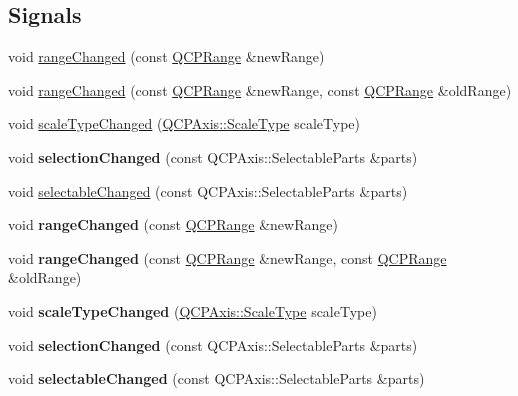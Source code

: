 \subsection*{Signals}
\begin{DoxyCompactItemize}
\item 
void \hyperlink{class_q_c_p_axis_a0894084e4c16a1736534c4095746f910}{range\+Changed} (const \hyperlink{class_q_c_p_range}{Q\+C\+P\+Range} \&new\+Range)
\item 
void \hyperlink{class_q_c_p_axis_aac8576288e8e31f16186124bc10dd10d}{range\+Changed} (const \hyperlink{class_q_c_p_range}{Q\+C\+P\+Range} \&new\+Range, const \hyperlink{class_q_c_p_range}{Q\+C\+P\+Range} \&old\+Range)
\item 
void \hyperlink{class_q_c_p_axis_a3505ed8a93bd2e349d858d84996bf767}{scale\+Type\+Changed} (\hyperlink{class_q_c_p_axis_a36d8e8658dbaa179bf2aeb973db2d6f0}{Q\+C\+P\+Axis\+::\+Scale\+Type} scale\+Type)
\item 
void {\bfseries selection\+Changed} (const Q\+C\+P\+Axis\+::\+Selectable\+Parts \&parts)\hypertarget{class_q_c_p_axis_a62b598abeee7174a05f9d542cc85b1f5}{}\label{class_q_c_p_axis_a62b598abeee7174a05f9d542cc85b1f5}

\item 
void \hyperlink{class_q_c_p_axis_aa5ff1fd851139028a3bb4efcb31de9fc}{selectable\+Changed} (const Q\+C\+P\+Axis\+::\+Selectable\+Parts \&parts)
\item 
void {\bfseries range\+Changed} (const \hyperlink{class_q_c_p_range}{Q\+C\+P\+Range} \&new\+Range)\hypertarget{class_q_c_p_axis_a0894084e4c16a1736534c4095746f910}{}\label{class_q_c_p_axis_a0894084e4c16a1736534c4095746f910}

\item 
void {\bfseries range\+Changed} (const \hyperlink{class_q_c_p_range}{Q\+C\+P\+Range} \&new\+Range, const \hyperlink{class_q_c_p_range}{Q\+C\+P\+Range} \&old\+Range)\hypertarget{class_q_c_p_axis_aac8576288e8e31f16186124bc10dd10d}{}\label{class_q_c_p_axis_aac8576288e8e31f16186124bc10dd10d}

\item 
void {\bfseries scale\+Type\+Changed} (\hyperlink{class_q_c_p_axis_a36d8e8658dbaa179bf2aeb973db2d6f0}{Q\+C\+P\+Axis\+::\+Scale\+Type} scale\+Type)\hypertarget{class_q_c_p_axis_a3505ed8a93bd2e349d858d84996bf767}{}\label{class_q_c_p_axis_a3505ed8a93bd2e349d858d84996bf767}

\item 
void {\bfseries selection\+Changed} (const Q\+C\+P\+Axis\+::\+Selectable\+Parts \&parts)\hypertarget{class_q_c_p_axis_a62b598abeee7174a05f9d542cc85b1f5}{}\label{class_q_c_p_axis_a62b598abeee7174a05f9d542cc85b1f5}

\item 
void {\bfseries selectable\+Changed} (const Q\+C\+P\+Axis\+::\+Selectable\+Parts \&parts)\hypertarget{class_q_c_p_axis_aa5ff1fd851139028a3bb4efcb31de9fc}{}\label{class_q_c_p_axis_aa5ff1fd851139028a3bb4efcb31de9fc}

\end{DoxyCompactItemize}
